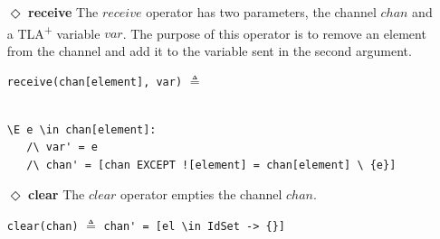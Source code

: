 \documentclass{thesul}
\newcommand{\tlaplus}{TLA\textsuperscript{+}\xspace}
\begin{document}
\begin{itemize}
The $multicast$ operator takes two parameters, the channel $chan$ and a \tlaplus expression. The second parameter specifies the intended recipients in the channel and the message. The purpose of this operator is to identify the recipients such that if they fall within the required subset, the message is added to their sets; otherwise, their sets remain unchanged.

\begin{minipage}{.4\textwidth}

\lstinline!multicast(chan, [a \in sub |-> msg])! $\triangleq$\\\\\\
\end{minipage}\hfill
\begin{minipage}{.8\textwidth}
\begin{lstlisting}[frame = none, numbers = none]
chan' = a \in DOMAIN chan |-> 
					IF a \in sub
					THEN chan[a] \cup {msg}
					ELSE chan[a]
\end{lstlisting}

\end{minipage}\hfill

\item[$\Diamond$]  \textbf{receive}
The $receive$ operator has two parameters, the channel $chan$ and a \tlaplus variable $var$. The purpose of this operator is to remove an element from the channel and add it to the variable sent in the second argument.

\begin{minipage}{.33\textwidth}

\lstinline|receive(chan[element], var)| $\triangleq$\\\\
\end{minipage}\hfill
\begin{minipage}{\textwidth}
\begin{lstlisting}[frame = none, numbers = none]
\E e \in chan[element]:
   /\ var' = e
   /\ chan' = [chan EXCEPT ![element] = chan[element] \ {e}]
\end{lstlisting}

\end{minipage}\hfill

\item[$\Diamond$]  \textbf{clear}
The $clear$ operator empties the channel $chan$.

\lstinline|clear(chan)| $\triangleq$
\lstinline|chan' = [el \in IdSet -> {}]|

\end{itemize}
\end{document}
